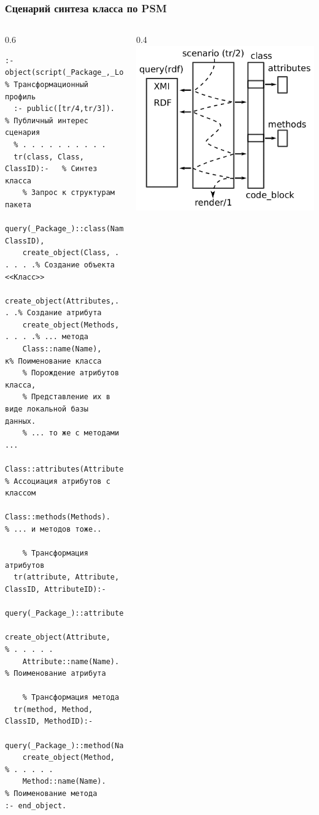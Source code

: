 \documentclass[10pt]{beamer}
\begin{document}
\begin{frame}[fragile]
  \frametitle{Сценарий синтеза класса по PSM}

  \begin{columns}
    \begin{column}{0.6\textwidth}
\begin{verbatim}
:- object(script(_Package_,_LocalProf_,_CodeProf_)). % Трансформационный профиль
  :- public([tr/4,tr/3]).                            % Публичный интерес сценария
  % . . . . . . . . . .
  tr(class, Class, ClassID):-   % Синтез класса
    % Запрос к структурам пакета
    query(_Package_)::class(Name, ClassID),
    create_object(Class, . . . . .% Создание объекта <<Класс>>
    create_object(Attributes,. . .% Создание атрибута
    create_object(Methods, . . . .% ... метода
    Class::name(Name),            к% Поименование класса
    % Порождение атрибутов класса,
    % Представление их в виде локальной базы данных.
    % ... то же с методами ...
    Class::attributes(Attributes),  % Ассоциация атрибутов с классом
    Class::methods(Methods).        % ... и методов тоже..

    % Трансформация атрибутов
  tr(attribute, Attribute, ClassID, AttributeID):-
    query(_Package_)::attribute(Name,ClassID,AttrID),
    create_object(Attribute,  % . . . . .
    Attribute::name(Name).    % Поименование атрибута

    % Трансформация метода
  tr(method, Method, ClassID, MethodID):-
    query(_Package_)::method(Name,ClassID,MethodID),
    create_object(Method,     % . . . . .
    Method::name(Name).       % Поименование метода
:- end_object.
\end{verbatim}
    \end{column}
    \begin{column}{0.4\linewidth}
      \includegraphics[width=1\linewidth]{scenario.pdf}
    \end{column}
  \end{columns}
\end{frame}
\end{document}

